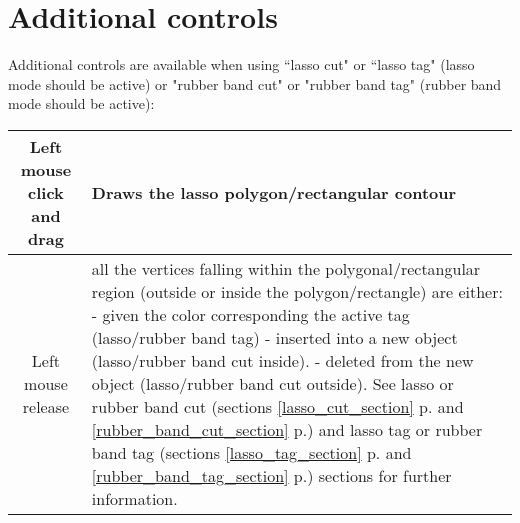 \section{Additional controls}
Additional controls are available when using ``lasso cut" or ``lasso tag" (lasso mode should be active) or "rubber band cut" or "rubber band tag" (rubber band mode should be active):\\
\begin{tabularx}{\linewidth}{ | c | X | }
\hline			
Left mouse click and drag & Draws the lasso polygon/rectangular contour\\ \hline			

Left mouse release &  all the vertices falling within the polygonal/rectangular region (outside or inside the polygon/rectangle) are either:\newline
- given the color corresponding the active tag (lasso/rubber band tag)\newline
- inserted into a new object (lasso/rubber band cut inside).\newline 
- deleted from the new object (lasso/rubber band cut outside).\newline 
See lasso or rubber band cut (sections \ref{lasso_cut_section} p.\pageref{lasso_cut_section} and \ref{rubber_band_cut_section} p.\pageref{rubber_band_cut_section}) and lasso tag or rubber band tag (sections \ref{lasso_tag_section} p.\pageref{lasso_tag_section} and \ref{rubber_band_tag_section} p.\pageref{rubber_band_tag_section}) sections for further information.\\ \hline	
		

\end{tabularx}

